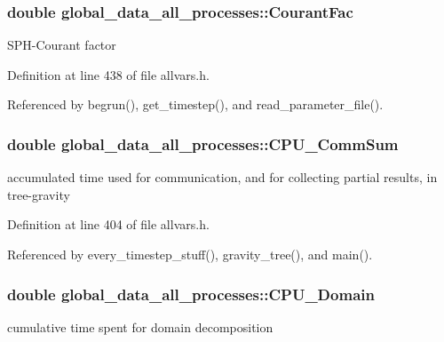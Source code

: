\hypertarget{structglobal__data__all__processes_aa4cf405da4e0a6fc588f5a5ba7e8fde8}{
\subsubsection[{CourantFac}]{\setlength{\rightskip}{0pt plus 5cm}double {\bf global\_\-data\_\-all\_\-processes::CourantFac}}}
\label{structglobal__data__all__processes_aa4cf405da4e0a6fc588f5a5ba7e8fde8}
SPH-\/Courant factor 

Definition at line 438 of file allvars.h.



Referenced by begrun(), get\_\-timestep(), and read\_\-parameter\_\-file().

\hypertarget{structglobal__data__all__processes_a41ab81d126219e1ff8119f8400428216}{
\subsubsection[{CPU\_\-CommSum}]{\setlength{\rightskip}{0pt plus 5cm}double {\bf global\_\-data\_\-all\_\-processes::CPU\_\-CommSum}}}
\label{structglobal__data__all__processes_a41ab81d126219e1ff8119f8400428216}
accumulated time used for communication, and for collecting partial results, in tree-\/gravity 

Definition at line 404 of file allvars.h.



Referenced by every\_\-timestep\_\-stuff(), gravity\_\-tree(), and main().

\hypertarget{structglobal__data__all__processes_a786736d9e91341733e286f6e03ab26a5}{
\subsubsection[{CPU\_\-Domain}]{\setlength{\rightskip}{0pt plus 5cm}double {\bf global\_\-data\_\-all\_\-processes::CPU\_\-Domain}}}
\label{structglobal__data__all__processes_a786736d9e91341733e286f6e03ab26a5}
cumulative time spent for domain decomposition 

